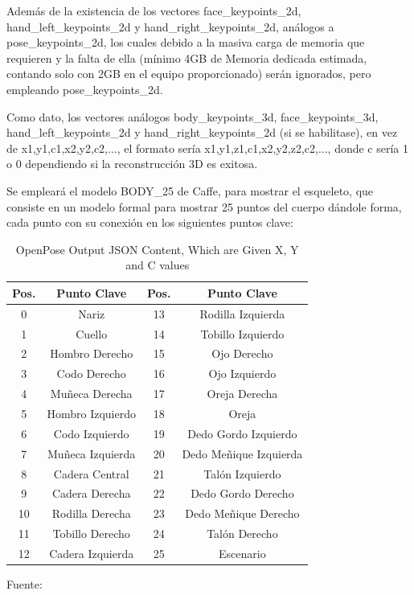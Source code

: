 Además de la existencia de los vectores face\_keypoints\_2d, hand\_left\_keypoints\_2d y hand\_right\_keypoints\_2d, análogos a pose\_keypoints\_2d, los cuales debido a la masiva carga de memoria que requieren y la falta de ella (mínimo 4GB de Memoria dedicada estimada, contando solo con 2GB en el equipo proporcionado) serán ignorados, pero empleando pose\_keypoints\_2d.

Como dato, los vectores análogos body\_keypoints\_3d, face\_keypoints\_3d,
hand\_left\_keypoints\_2d y hand\_right\_keypoints\_2d (si se habilitase), en vez de 
x1,y1,c1,x2,y2,c2,..., el formato sería x1,y1,z1,c1,x2,y2,z2,c2,..., donde c sería 1 o 0 dependiendo si la reconstrucción 3D es exitosa.

Se empleará el modelo BODY\_25 de Caffe, para mostrar el esqueleto, que consiste en un modelo formal para mostrar 25 puntos del cuerpo dándole forma, cada punto con su conexión en los siguientes puntos clave:

\begin{table}[t]
	\begin{center}
		\begin{tabular}{| c | c | c | c | }
			\hline Pos. & Punto Clave & Pos. & Punto Clave \\ \hline
			0 & Nariz&13 & Rodilla Izquierda \\ \hline
			1 & Cuello &14 & Tobillo Izquierdo \\ \hline
			2 & Hombro Derecho& 15 & Ojo Derecho \\ \hline
			3 & Codo Derecho & 16 & Ojo Izquierdo \\ \hline
			4 & Muñeca Derecha & 17 & Oreja Derecha \\ \hline
			5 & Hombro Izquierdo & 18 & Oreja \\ \hline
			6 & Codo Izquierdo & 19 & Dedo Gordo Izquierdo \\ \hline
			7 & Muñeca Izquierda & 20 & Dedo Meñique Izquierda \\ \hline
			8 & Cadera Central & 21 & Talón Izquierdo \\ \hline
			9 & Cadera Derecha & 22 & Dedo Gordo Derecho \\ \hline
			10 & Rodilla Derecha & 23 & Dedo Meñique Derecho\\ \hline
			11 & Tobillo Derecho & 24 & Talón Derecho \\ \hline
			12 & Cadera Izquierda & 25 & Escenario \\ \hline
		\end{tabular}
		\caption{OpenPose Output JSON Content, Which are Given X, Y and C values}
		\footnotesize Fuente:\cite{8765346}
	\end{center}
\end{table}

